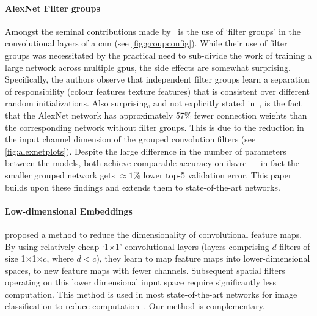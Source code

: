 \documentclass[thesis]{subfiles}
\begin{document}
	\paragraph{AlexNet Filter groups} Amongst the seminal contributions made by \citet{Krizhevsky2012}~is the use of `filter groups' in the convolutional layers of a \gls{cnn} (see \cref{fig:groupconfig}). While their use of filter groups was necessitated by the practical need to sub-divide the work of training a large network across multiple \gls{gpu}s, the side effects are somewhat surprising. Specifically, the authors observe that independent filter groups learn a separation of responsibility (colour features \vs{}texture features) that is consistent over different random initializations. Also surprising, and not explicitly stated in~\citep{Krizhevsky2012}, is the fact that the AlexNet network has approximately 57\% fewer connection weights than the corresponding network without filter groups. This is due to the reduction in the input channel dimension of the grouped convolution filters (see \cref{fig:alexnetplots}).
	Despite the large difference in the number of parameters between the models, both achieve comparable accuracy on \gls{ilsvrc} --- in fact the smaller grouped network gets $\approx1$\% lower top-5 validation error. This paper builds upon these findings and extends them to state-of-the-art networks.
	
	\paragraph{Low-dimensional Embeddings}
	\citet{Lin2013NiN} proposed a method to reduce the dimensionality of convolutional feature maps. 
	By using relatively cheap `1$\times$1' convolutional layers (\ie layers comprising $d$ filters of size 1$\times$1$\times$$c$, where $d<c$), they learn to map feature maps into lower-dimensional spaces, \ie to new feature maps with fewer channels. Subsequent spatial filters operating on this lower dimensional input space require significantly less computation. This method is used in most state-of-the-art networks for image classification to reduce computation~\citep{Szegedy2014going,He2015}. Our method is complementary.
	
\end{document}

